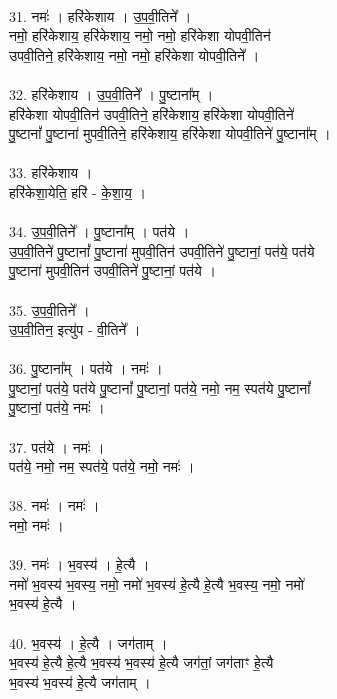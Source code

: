 \\
31. नमः॑ । हरि॑केशाय । उ॒प॒वी॒तिने᳚ ।\\
नमो॒ हरि॑केशाय॒ हरि॑केशाय॒ नमो॒ नमो॒ हरि॑केशा योपवी॒तिन॑\\
उपवी॒तिने॒ हरि॑केशाय॒ नमो॒ नमो॒ हरि॑केशा योपवी॒तिने᳚ ।\\
\\
32. हरि॑केशाय । उ॒प॒वी॒तिने᳚ । पु॒ष्टाना᳚म् ।\\
हरि॑केशा योपवी॒तिन॑ उपवी॒तिने॒ हरि॑केशाय॒ हरि॑केशा योपवी॒तिने॑\\
पु॒ष्टानां᳚ पु॒ष्टाना॑ मुपवी॒तिने॒ हरि॑केशाय॒ हरि॑केशा योपवी॒तिने॑ पु॒ष्टाना᳚म् ।\\
\\
33. हरि॑केशाय ।\\
हरि॑केशा॒येति॒ हरि॑ - के॒शा॒य॒ ।\\
\\
34. उ॒प॒वी॒तिने᳚ । पु॒ष्टाना᳚म् । पत॑ये ।\\
उ॒प॒वी॒तिने॑ पु॒ष्टानां᳚ पु॒ष्टाना॑ मुपवी॒तिन॑ उपवी॒तिने॑ पु॒ष्टानां॒ पत॑ये॒ पत॑ये\\
पु॒ष्टाना॑ मुपवी॒तिन॑ उपवी॒तिने॑ पु॒ष्टानां॒ पत॑ये ।\\
\\
35. उ॒प॒वी॒तिने᳚ ।\\
उ॒प॒वी॒तिन॒ इत्यु॑प - वी॒तिने᳚ ।\\
\\
36. पु॒ष्टाना᳚म् । पत॑ये । नमः॑ ।\\
पु॒ष्टानां॒ पत॑ये॒ पत॑ये पु॒ष्टानां᳚ पु॒ष्टानां॒ पत॑ये॒ नमो॒ नम॒ स्पत॑ये पु॒ष्टानां᳚\\
पु॒ष्टानां॒ पत॑ये॒ नमः॑ ।\\
\\
37. पत॑ये । नमः॑ ।\\
पत॑ये॒ नमो॒ नम॒ स्पत॑ये॒ पत॑ये॒ नमो॒ नमः॑ ।\\
\\
38. नमः॑ । नमः॑ ।\\
नमो॒ नमः॑ ।\\
\\
39. नमः॑ । भ॒वस्य॑ । हे॒त्यै ।\\
नमो॑ भ॒वस्य॑ भ॒वस्य॒ नमो॒ नमो॑ भ॒वस्य॑ हे॒त्यै हे॒त्यै भ॒वस्य॒ नमो॒ नमो॑\\
भ॒वस्य॑ हे॒त्यै ।\\
\\
40. भ॒वस्य॑ । हे॒त्यै । जग॑ताम् ।\\
भ॒वस्य॑ हे॒त्यै हे॒त्यै भ॒वस्य॑ भ॒वस्य॑ हे॒त्यै जग॑तां॒ जग॑ताꣳ हे॒त्यै\\
भ॒वस्य॑ भ॒वस्य॑ हे॒त्यै जग॑ताम् ।\\
